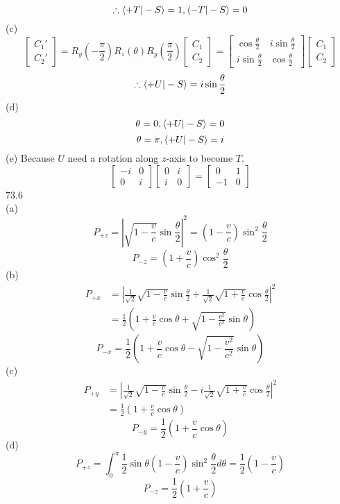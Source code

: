 \documentclass[utf8]{ctexart}
\begin{document}
\[\therefore\braket{+T|-S}=1,\braket{-T|-S}=0\]
(c)
\[\begin{bmatrix}
	C_1'\\
	C_2'
\end{bmatrix}
=R_y(-\frac{\pi}{2})R_z(\theta)R_y(\frac{\pi}{2})\begin{bmatrix}
	C_1\\
	C_2
\end{bmatrix}
=\begin{bmatrix}
	\cos\frac{\theta}{2}&i\sin\frac{\theta}{2}\\
	i\sin\frac{\theta}{2}&\cos\frac{\theta}{2}
\end{bmatrix}\begin{bmatrix}
C_1\\
C_2
\end{bmatrix}\]
\[\therefore\braket{+U|-S}=i\sin\frac{\theta}{2}\]
(d)
\[\theta=0,\braket{+U|-S}=0\]
\[\theta=\pi,\braket{+U|-S}=i\]
(e)
Because $U$ need a rotation along $z$-axis to become $T$.
\[\begin{bmatrix}
	-i&0\\
	0&i
\end{bmatrix}\begin{bmatrix}
	0&i\\
	i&0
\end{bmatrix}=\begin{bmatrix}
0&1\\
-1&0
\end{bmatrix}\]
73.6\\
(a)
\[P_{+z}=|\sqrt{1-\frac{v}{c}}\sin\frac{\theta}{2}|^2=(1-\frac{v}{c})\sin^2\frac{\theta}{2}\]
\[P_{-z}=(1+\frac{v}{c})\cos^2\frac{\theta}{2}\]
(b)
\begin{align*}
	P_{+x}&=|\frac{1}{\sqrt{2}}\sqrt{1-\frac{v}{c}}\sin\frac{\theta}{2}+\frac{1}{\sqrt{2}}\sqrt{1+\frac{v}{c}}\cos\frac{\theta}{2}|^2\\
	&=\frac{1}{2}(1+\frac{v}{c}\cos\theta+\sqrt{1-\frac{v^2}{c^2}}\sin\theta)
\end{align*}
\[P_{-x}=\frac{1}{2}(1+\frac{v}{c}\cos\theta-\sqrt{1-\frac{v^2}{c^2}}\sin\theta)\]
(c)
\begin{align*}
	P_{+y}&=|\frac{1}{\sqrt{2}}\sqrt{1-\frac{v}{c}}\sin\frac{\theta}{2}-i\frac{1}{\sqrt{2}}\sqrt{1+\frac{v}{c}}\cos\frac{\theta}{2}|^2\\
	&=\frac{1}{2}(1+\frac{v}{c}\cos\theta)
\end{align*}
\[P_{-y}=\frac{1}{2}(1+\frac{v}{c}\cos\theta)\]
(d)
\[P_{+z}=\int_{0}^{\pi}\frac{1}{2}\sin\theta(1-\frac{v}{c})\sin^2\frac{\theta}{2}d\theta=\frac{1}{2}(1-\frac{v}{c})\]
\[P_{-z}=\frac{1}{2}(1+\frac{v}{c})\]
\end{document}
